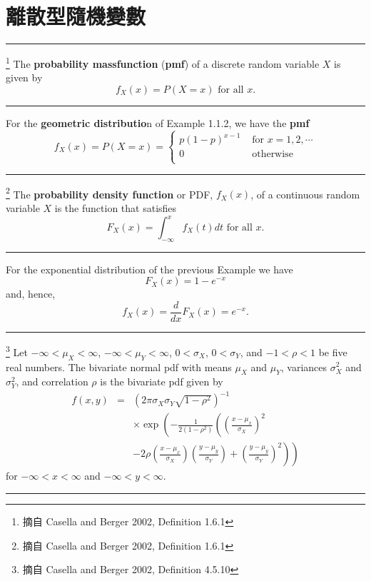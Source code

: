 \documentclass[12pt, a4paper]{article}
\begin{document}
\section{{\MB 離散型隨機變數}}
\noindent \rule{\textwidth}{0.2pt}
\begin{de}\footnote{摘自 Casella and Berger 2002, Definition 1.6.1} %
The \textbf{probability massfunction} (\textbf{pmf}) of a discrete random variable $X$ is given by
\[f_X(x)=P(X=x) \mbox{ for all } x.\]
\noindent \rule{\textwidth}{0.2pt}
\end{de}
\bigskip
 
\begin{ex} %
For the \textbf{geometric distributio}n of Example 1.1.2, we have the \textbf{pmf}
\[f_X(x)=P(X=x)=\left\{\begin{array}{ll} p(1-p)^{x-1}  & \mbox{ for } x=1, 2, \cdots \\
                                              0        & \mbox{ otherwise } \\ \end{array}\right.\]
\end{ex}
\bigskip
\noindent \rule{\textwidth}{0.2pt}
\begin{de}\footnote{摘自 Casella and Berger 2002, Definition 1.6.1}  %
The \textbf{probability density function} or PDF, $f_X(x)$, of a continuous random variable $X$ is the function that
satisfies
\[F_X(x)=\int_{-\infty}^x f_X(t)dt \mbox{ for all } x.\]
\noindent \rule{\textwidth}{0.2pt}
\end{de}
\bigskip

\begin{ex} %
For the exponential distribution of the previous Example we have
\[F_X(x)=1-e^{-x}\]
and, hence,
\[f_X(x)=\frac{d}{dx}F_X(x)=e^{-x}.\]
\end{ex}
\bigskip

\noindent \rule{\textwidth}{0.2pt}
\begin{de}\footnote{摘自 Casella and Berger 2002, Definition 4.5.10}   %
Let $-\infty<\mu_X<\infty$, $-\infty<\mu_Y<\infty$, $0<\sigma_X$, $0<\sigma_Y$, and
$-1<\rho<1$ be five real numbers.  The bivariate normal pdf with means $\mu_X$ and $\mu_Y$,
variances $\sigma_X^2$ and $\sigma_Y^2$, and correlation $\rho$ is the bivariate pdf given by
\begin{eqnarray*}
f(x,y)&=&\left( 2\pi\sigma_X\sigma_Y\sqrt{1-\rho^2}\right)^{-1}\\
      && \times\exp\left(-\frac{1}{2(1-\rho^2)}\left(\left(\frac{x-\mu_x}{\sigma_X}\right)^2\right.\right.\\
      && \left.\left.-2\rho\left(\frac{x-\mu_x}{\sigma_X}\right)\left(\frac{y-\mu_y}{\sigma_Y}\right)
      +\left(\frac{y-\mu_y}{\sigma_Y}\right)^2 \right)\right)
\end{eqnarray*}
for $-\infty<x<\infty$ and $-\infty<y<\infty$.\\
\noindent \rule{\textwidth}{0.2pt}
\end{de}
\end{document}

